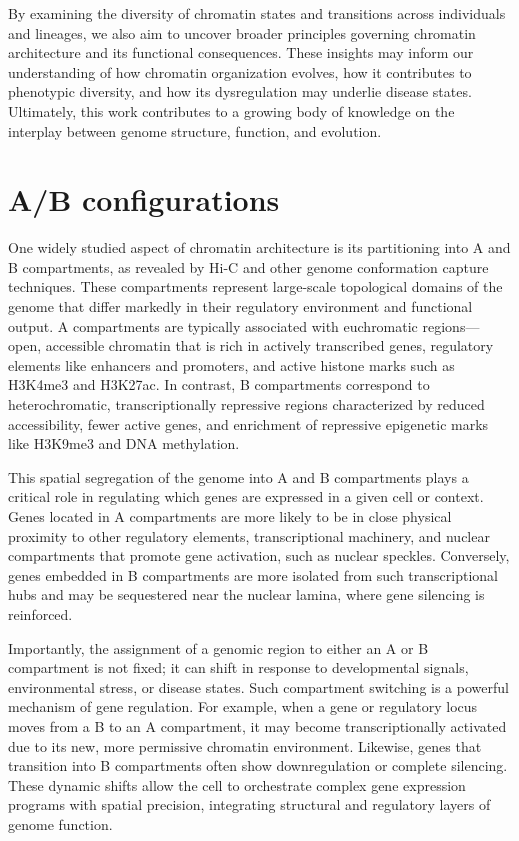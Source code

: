 \documentclass[
  a4paper,
]{scrbook}
\begin{document}
By examining the diversity of chromatin states and transitions across
individuals and lineages, we also aim to uncover broader principles
governing chromatin architecture and its functional consequences. These
insights may inform our understanding of how chromatin organization
evolves, how it contributes to phenotypic diversity, and how its
dysregulation may underlie disease states. Ultimately, this work
contributes to a growing body of knowledge on the interplay between
genome structure, function, and evolution.

\chapter{A/B configurations}\label{ab-configurations}

One widely studied aspect of chromatin architecture is its partitioning
into A and B compartments, as revealed by Hi-C and other genome
conformation capture techniques. These compartments represent
large-scale topological domains of the genome that differ markedly in
their regulatory environment and functional output. A compartments are
typically associated with euchromatic regions---open, accessible
chromatin that is rich in actively transcribed genes, regulatory
elements like enhancers and promoters, and active histone marks such as
H3K4me3 and H3K27ac. In contrast, B compartments correspond to
heterochromatic, transcriptionally repressive regions characterized by
reduced accessibility, fewer active genes, and enrichment of repressive
epigenetic marks like H3K9me3 and DNA methylation.

This spatial segregation of the genome into A and B compartments plays a
critical role in regulating which genes are expressed in a given cell or
context. Genes located in A compartments are more likely to be in close
physical proximity to other regulatory elements, transcriptional
machinery, and nuclear compartments that promote gene activation, such
as nuclear speckles. Conversely, genes embedded in B compartments are
more isolated from such transcriptional hubs and may be sequestered near
the nuclear lamina, where gene silencing is reinforced.

Importantly, the assignment of a genomic region to either an A or B
compartment is not fixed; it can shift in response to developmental
signals, environmental stress, or disease states. Such compartment
switching is a powerful mechanism of gene regulation. For example, when
a gene or regulatory locus moves from a B to an A compartment, it may
become transcriptionally activated due to its new, more permissive
chromatin environment. Likewise, genes that transition into B
compartments often show downregulation or complete silencing. These
dynamic shifts allow the cell to orchestrate complex gene expression
programs with spatial precision, integrating structural and regulatory
layers of genome function.
\end{document}
